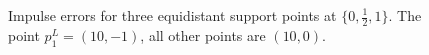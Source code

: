 \begin{figure}[h!]
\caption{Impulse errors for three equidistant support points at $\{0,\frac{1}{2},1\}$. The point $p_1^L=(10,-1)$, all other points are $(10,0)$.}
\label{fig:equidist_3_alles_default_ausser_p1_10_-1}
\end{figure}

